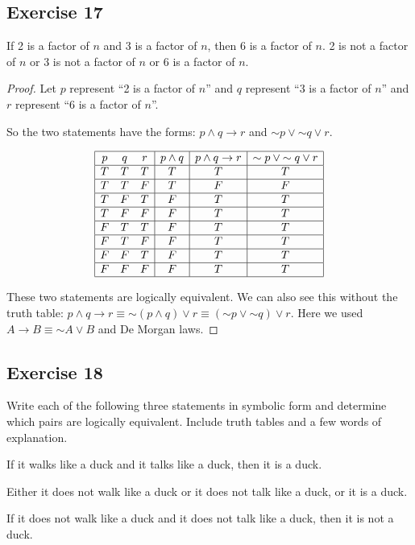 \documentclass[14pt]{extarticle}
\begin{document}
\subsection{Exercise 17}
If 2 is a factor of $n$ and 3 is a factor of $n$, then 6 is a factor of $n$. 2
is not a factor of $n$ or 3 is not a factor of $n$ or 6 is a factor of $n$.

\begin{proof}
Let $p$ represent “2 is a factor of $n$” and $q$ represent “3 is a factor of
$n$” and $r$ represent ``6 is a factor of $n$''.

So the two statements have the forms: $p \wedge q \to r$ and ${\sim p} \vee
{\sim q} \vee r$.

$$
\begin{array}{|ccc|c|c|c|}
\hline
p & q & r & p \wedge q & p \wedge q \to r & {\sim p} \vee {\sim q} \vee r \\
\hline
T & T & T & T & T & T \\
\hline
T & T & F & T & F & F \\
\hline
T & F & T & F & T & T \\
\hline
T & F & F & F & T & T \\
\hline
F & T & T & F & T & T \\
\hline
F & T & F & F & T & T \\
\hline
F & F & T & F & T & T \\
\hline
F & F & F & F & T & T \\
\hline
\end{array}
$$

These two statements are logically equivalent. We can also see this without the
truth table: $p \wedge q \to r \equiv {\sim (p \wedge q)} \vee r \equiv ({\sim
p} \vee {\sim q}) \vee r$. Here we used $A \to B \equiv {\sim A} \vee B$ and De
Morgan laws.
\end{proof}

\subsection{Exercise 18}
Write each of the following three statements in symbolic form and determine
which pairs are logically equivalent. Include truth tables and a few words of
explanation.

If it walks like a duck and it talks like a duck, then it is a duck.

Either it does not walk like a duck or it does not talk like a duck, or it is a
duck.

If it does not walk like a duck and it does not talk like a duck, then it is not
a duck.
\end{document}
